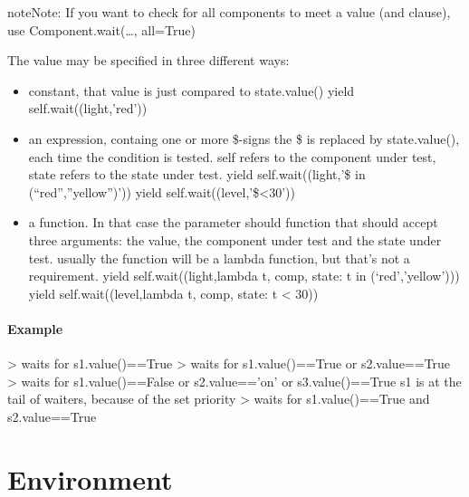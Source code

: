 \documentclass[letterpaper,10pt,english]{sphinxmanual}
\begin{document}
\begin{fulllineitems}
\begin{fulllineitems}
\begin{sphinxadmonition}{note}{Note:}
If you want to check for all components to meet a value (and clause),
use Component.wait(…, all=True)

The value may be specified in three different ways:
\begin{itemize}
\item {} 
constant, that value is just compared to state.value() 
yield self.wait((light,’red’))

\item {} 
an expression, containg one or more \$-signs
the \$ is replaced by state.value(), each time the condition is tested. 
self refers to the component under test, state refers to the state
under test. 
yield self.wait((light,’\$ in (“red”,”yellow”)’)) 
yield self.wait((level,’\$\textless{}30’)) 

\item {} 
a function. In that case the parameter should function that
should accept three arguments: the value, the component under test and the
state under test. 
usually the function will be a lambda function, but that’s not
a requirement. 
yield self.wait((light,lambda t, comp, state: t in (‘red’,’yellow’))) 
yield self.wait((level,lambda t, comp, state: t \textless{} 30)) 

\end{itemize}
\end{sphinxadmonition}
\paragraph{Example}

\textendash{}\textgreater{} waits for s1.value()==True 
\textendash{}\textgreater{} waits for s1.value()==True or s2.value==True 
\textendash{}\textgreater{} waits for s1.value()==False or s2.value==’on’ or s3.value()==True 
s1 is at the tail of waiters, because of the set priority 
\textendash{}\textgreater{} waits for s1.value()==True and s2.value==True 

\end{fulllineitems}


\end{fulllineitems}



\section{Environment}
\label{\detokenize{Reference:environment}}
\end{document}
